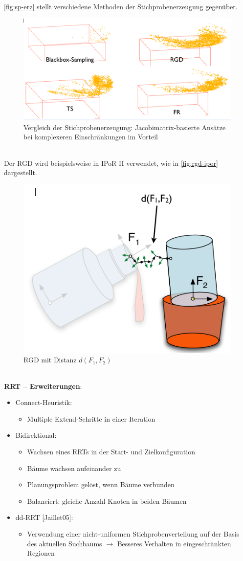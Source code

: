 \autoref{fig:sp-erz} stellt verschiedene Methoden der Stichprobenerzeugung gegenüber.
\begin{figure}[h!]
	\centering
	\includegraphics[width=.7\textwidth]{figures/ch04_sp-erz.png}
	\caption{Vergleich der Stichprobenerzeugung: Jacobimatrix-basierte Ansätze bei komplexeren Einschränkungen im Vorteil}
	\label{fig:sp-erz}
\end{figure}\\
Der RGD wird beispielsweise in IPoR II verwendet, wie in \autoref{fig:rgd-ipor} dargestellt.
\begin{figure}[h!]
	\centering
	\includegraphics[width=.3\textwidth]{figures/ch04_rgd-ipor.png}
	\caption{RGD mit Distanz $d(F_1 ,F_2)$}
	\label{fig:rgd-ipor}
\end{figure}\\
\textbf{RRT -- Erweiterungen}:
\begin{itemize}
\item Connect-Heuristik:
\begin{itemize}
\item Multiple Extend-Schritte in einer Iteration
\end{itemize}
\item Bidirektional:
\begin{itemize}
\item Wachsen eines RRTs in der Start- und Zielkonfiguration
\item Bäume wachsen aufeinander zu
\item Planungsproblem gelöst, wenn Bäume verbunden
\item Balanciert: gleiche Anzahl Knoten in beiden Bäumen
\end{itemize}
\item dd-RRT [Jaillet05]:
\begin{itemize}
\item Verwendung einer nicht-uniformen Stichprobenverteilung auf der Basis des aktuellen Suchbaums $\rightarrow$ Besseres Verhalten in eingeschränkten Regionen
\end{itemize}
\end{itemize}
